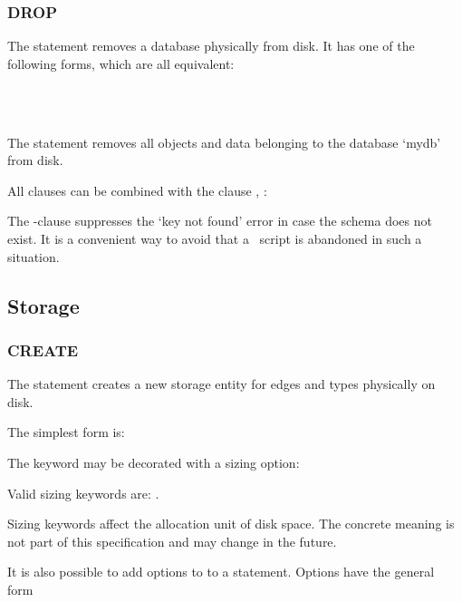 \subsubsection{DROP}
The  statement
removes a database physically from disk.
It has one of the following forms,
which are all equivalent:

 \\
 \\
 

The statement removes all objects and data
belonging to the database `mydb' from disk.

All  clauses can be combined
with the clause , \eg:

  

The -clause
suppresses the `key not found' error
in case the schema
does not exist.
It is a convenient way to avoid
that a \sql\ script is abandoned
in such a situation.


\subsection{Storage}
\subsubsection{CREATE}
The  statement
creates a new storage entity for edges and types
physically on disk.

The simplest form is:

 

The keyword  may be decorated
with a sizing option:

 

Valid sizing keywords are:
.

Sizing keywords affect the allocation unit
of disk space. The concrete meaning is not
part of this specification and may change
in the future.

It is also possible to add options to
to a  statement.
Options have the general form

